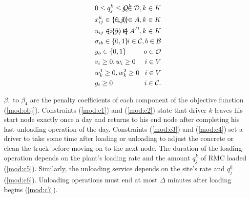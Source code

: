 \documentclass{article}
\begin{document}
\begin{alignat}{3}
    \label{mod:c32} &  0 \leq q^k_j \leq Q^k  & \hspace{-20mm}  j \in \mathcal{D}, k \in K \\
    \label{mod:c33} &  x^k_{ij} \in \{0,1\} & \hspace{-20mm}  (i,j) \in A , k \in K  \hspace{0mm} \\
    \label{mod:c34} &  u_{ij} \in \{0,1\} & \hspace{-20mm}  (i,j) \in A^D , k \in K  \hspace{0mm} \\
    \label{mod:c35} &  \sigma_{ib} \in \{0,1\} & \hspace{-20mm}  i \in \mathcal{C}, b \in \mathcal{B} \\
    \label{mod:c36} &  y_o \in \{0,1\} & \hspace{-20mm}  o \in \mathcal{O} \\
    \label{mod:c37} &  v_i \geq 0,  w_i \geq 0 & \hspace{-20mm}  i \in V \\\
    \label{mod:c38} &  w^1_{k} \geq 0,  w^2_k \geq 0  & \hspace{-20mm}  i \in V \\
    \label{mod:cend} &  g_i \geq 0   & \hspace{-20mm}  i \in \mathcal{C}.
\end{alignat}

$\beta_1$ to $\beta_4$ are the penalty coefficients of each component of the objective function (\ref{mod:obj}). Constraints (\ref{mod:c1}) and (\ref{mod:c2}) state that driver $k$ leaves his start node exactly once a day and returns to his end node after completing his last unloading operation of the day. Constraints (\ref{mod:c3}) and (\ref{mod:c4}) set a driver to take some time after loading or unloading to adjust the concrete or clean the truck before moving on to the next node. The duration of the loading operation depends on the plant's loading rate and the amount $q^k_j$ of RMC loaded (\ref{mod:c5}). Similarly, the unloading service depends on the site's rate and $q^k_j$ (\ref{mod:c6}). Unloading operations must end at most $\Delta$ minutes after loading begins (\ref{mod:c7}). 
\end{document}
